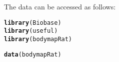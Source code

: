 \documentclass{article}\usepackage[]{graphicx}\usepackage[usenames,dvipsnames]{color}
\makeatletter
\newcommand{\hlstd}[1]{\textcolor[rgb]{0.345,0.345,0.345}{#1}}%
\newcommand{\hlkwd}[1]{\textcolor[rgb]{0.737,0.353,0.396}{\textbf{#1}}}%
\newenvironment{kframe}{%
 \def\at@end@of@kframe{}%
 \ifinner\ifhmode%
  \def\at@end@of@kframe{\end{minipage}}%
  \begin{minipage}{\columnwidth}%
 \fi\fi%
 \def\FrameCommand##1{\hskip\@totalleftmargin \hskip-\fboxsep
 \colorbox{shadecolor}{##1}\hskip-\fboxsep
     \hskip-\linewidth \hskip-\@totalleftmargin \hskip\columnwidth}%
 \MakeFramed {\advance\hsize-\width
   \@totalleftmargin\z@ \linewidth\hsize
   \@setminipage}}%
 {\par\unskip\endMakeFramed%
 \at@end@of@kframe}
\newenvironment{knitrout}{}{} %
\makeatother
\begin{document}
The data can be accessed as follows:
\begin{knitrout}
\color{fgcolor}\begin{kframe}
\begin{alltt}
\hlkwd{library}\hlstd{(Biobase)}
\hlkwd{library}\hlstd{(useful)}
\hlkwd{library}\hlstd{(bodymapRat)}
\end{alltt}
\end{kframe}
\end{knitrout}

\begin{knitrout}
\color{fgcolor}\begin{kframe}
\begin{alltt}
\hlkwd{data}\hlstd{(bodymapRat)}


\end{alltt}
\end{kframe}
\end{knitrout}
\end{document}
